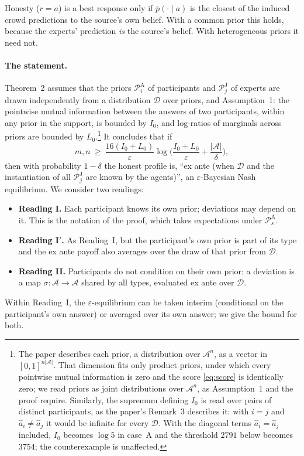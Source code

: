 \documentclass[11pt]{article}
\theoremstyle{remark}
\newcommand{\cD}{\mathcal{D}}
\newcommand{\cA}{\mathcal{A}}
\newcommand{\cP}{\mathcal{P}}
\newcommand{\pb}{\bar p}
\begin{document}
Honesty ($r=a$) is a best response only if $\pb(\cdot\mid a)$ is the closest of the induced crowd predictions to the source's own belief. With a common prior this holds, because the experts' prediction \emph{is} the source's belief. With heterogeneous priors it need not.

\paragraph{The statement.} Theorem~2 assumes that the priors $\cP_i^{\mathrm A}$ of participants and $\cP_j^{\mathrm J}$ of experts are drawn independently from a distribution $\cD$ over priors, and Assumption~1: the pointwise mutual information between the answers of two participants, within any prior in the support, is bounded by $I_0$, and log-ratios of marginals across priors are bounded by $L_0$.\footnote{The paper describes each prior, a distribution over $\cA^n$, as a vector in $[0,1]^{n|\cA|}$. That dimension fits only product priors, under which every pointwise mutual information is zero and the score \eqref{eq:score} is identically zero; we read priors as joint distributions over $\cA^n$, as Assumption~1 and the proof require. Similarly, the supremum defining $I_0$ is read over pairs of distinct participants, as the paper's Remark~3 describes it: with $i=j$ and $\hat a_i\neq\hat a_j$ it would be infinite for every $\cD$. With the diagonal terms $\hat a_i=\hat a_j$ included, $I_0$ becomes $\log5$ in case~A and the threshold $2791$ below becomes $3754$; the counterexample is unaffected.} It concludes that if
\begin{equation}
m,n\ \ge\ \frac{16(I_0+L_0)}{\varepsilon}\log\Big(\frac{I_0+L_0}{\varepsilon}+\frac{|\cA|}{\delta}\Big),\label{eq:thr}
\end{equation}
then with probability $1-\delta$ the honest profile is, ``ex ante (when $\cD$ and the instantiation of all $\cP_j^{\mathrm J}$ are known by the agents)'', an $\varepsilon$-Bayesian Nash equilibrium. We consider two readings:
\begin{itemize}
\item \textbf{Reading I.} Each participant knows its own prior; deviations may depend on it. This is the notation of the proof, which takes expectations under $\cP_s^{\mathrm A}$.
\item \textbf{Reading I$'$.} As Reading~I, but the participant's own prior is part of its type and the ex ante payoff also averages over the draw of that prior from $\cD$.
\item \textbf{Reading II.} Participants do not condition on their own prior: a deviation is a map $\sigma:\cA\to\cA$ shared by all types, evaluated ex ante over $\cD$.
\end{itemize}
Within Reading~I, the $\varepsilon$-equilibrium can be taken interim (conditional on the participant's own answer) or averaged over its own answer; we give the bound for both.
\end{document}
